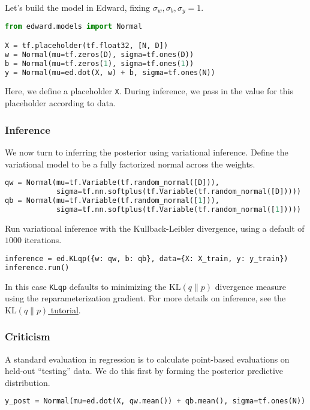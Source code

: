 Let's build the model in Edward, fixing $\sigma_w,\sigma_b,\sigma_y=1$.
\begin{lstlisting}[language=Python]
from edward.models import Normal

X = tf.placeholder(tf.float32, [N, D])
w = Normal(mu=tf.zeros(D), sigma=tf.ones(D))
b = Normal(mu=tf.zeros(1), sigma=tf.ones(1))
y = Normal(mu=ed.dot(X, w) + b, sigma=tf.ones(N))
\end{lstlisting}
Here, we define a placeholder \texttt{X}. During inference, we pass in
the value for this placeholder according to data.

\subsubsection{Inference}

We now turn to inferring the posterior using variational inference.
Define the variational model to be a fully factorized normal across
the weights.
\begin{lstlisting}[language=Python]
qw = Normal(mu=tf.Variable(tf.random_normal([D])),
            sigma=tf.nn.softplus(tf.Variable(tf.random_normal([D]))))
qb = Normal(mu=tf.Variable(tf.random_normal([1])),
            sigma=tf.nn.softplus(tf.Variable(tf.random_normal([1]))))
\end{lstlisting}

Run variational inference with the Kullback-Leibler divergence, using a
default of $1000$ iterations.
\begin{lstlisting}[language=Python]
inference = ed.KLqp({w: qw, b: qb}, data={X: X_train, y: y_train})
inference.run()
\end{lstlisting}
In this case \texttt{KLqp} defaults to minimizing the
$\text{KL}(q\|p)$ divergence measure using the reparameterization
gradient.
For more details on inference, see the \href{/tutorials/klqp}{$\text{KL}(q\|p)$ tutorial}.

\subsubsection{Criticism}

A standard evaluation in regression is to calculate point-based evaluations on
held-out ``testing'' data. We do this first by forming the posterior predictive
distribution.
\begin{lstlisting}[language=Python]
y_post = Normal(mu=ed.dot(X, qw.mean()) + qb.mean(), sigma=tf.ones(N))
\end{lstlisting}

